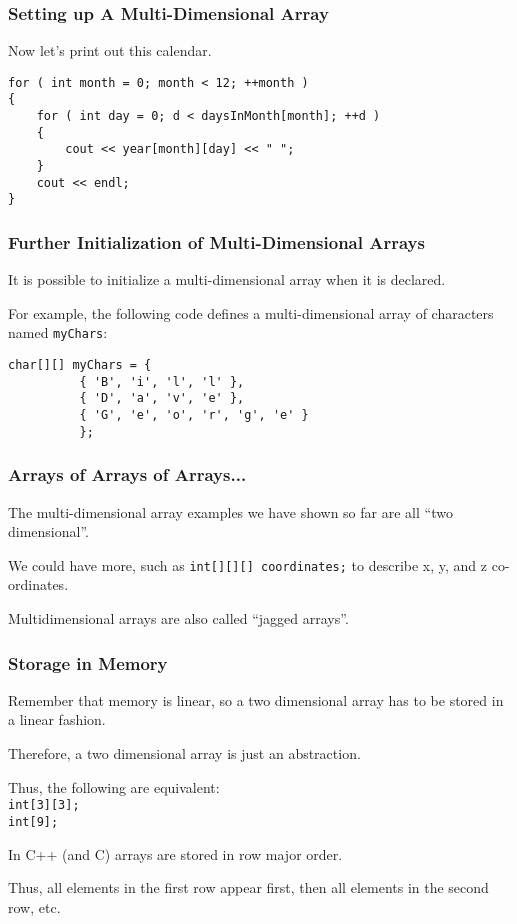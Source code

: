 \begin{frame}[fragile]
\frametitle{Setting up A Multi-Dimensional Array}

Now let's print out this calendar.

\begin{verbatim}
for ( int month = 0; month < 12; ++month )
{
    for ( int day = 0; d < daysInMonth[month]; ++d )
    {
        cout << year[month][day] << " ";
    }
    cout << endl;
}
\end{verbatim}

\end{frame}

\begin{frame}[fragile]
\frametitle{Further Initialization of Multi-Dimensional Arrays}
It is possible to initialize a multi-dimensional array when it is declared.

For example, the following code defines a multi-dimensional array of characters named \texttt{myChars}:

\begin{verbatim}
char[][] myChars = {
          { 'B', 'i', 'l', 'l' },
          { 'D', 'a', 'v', 'e' },
          { 'G', 'e', 'o', 'r', 'g', 'e' }
          };
\end{verbatim}

\end{frame}

\begin{frame}
\frametitle{Arrays of Arrays of Arrays...}

The multi-dimensional array examples we have shown so far are all ``two dimensional''.

We could have more, such as \texttt{int[][][] coordinates;} to describe x, y, and z co-ordinates.

Multidimensional arrays are also called ``\alert{jagged} arrays''.

\end{frame}



\begin{frame}
\frametitle{Storage in Memory}

Remember that memory is linear, so a two dimensional array has to be stored in a linear fashion.

Therefore, a two dimensional array is just an abstraction. 

Thus, the following are equivalent:\\
\quad \texttt{int[3][3];}\\
\quad \texttt{int[9];}



In C++ (and C) arrays are stored in \alert{row major} order.

Thus, all elements in the first row appear first, then all elements in the second row, etc.




\end{frame}



